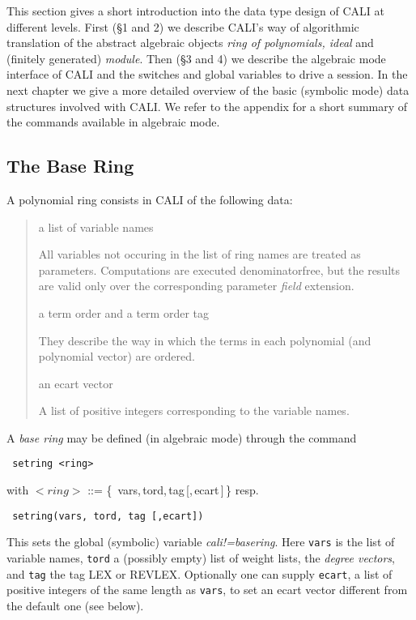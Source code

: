 \documentclass[a4paper,11pt]{article}
\newcommand{\ind}[1]{{\em #1}\index{#1}}
\newcommand{\pbx}[1]{\mbox{}\hfill \parbox[t]{12cm}{#1} \pagebreak[3]}
\begin{document}
This section gives a short introduction into the data type design of
CALI at different levels. First (\S 1 and 2) we describe CALI's way
of algorithmic translation of the abstract algebraic objects {\em
ring of polynomials, ideal} and (finitely generated) {\em module}.
Then (\S 3 and 4) we describe the algebraic mode interface of CALI
and the switches and global variables to drive a session. In the next
chapter we give a more detailed overview of the basic (symbolic mode) data
structures involved with CALI. We refer to the appendix for a short
summary of the commands available in algebraic mode.

\subsection{The Base Ring}

A polynomial ring consists in CALI of the following data:
\begin{quote}
a list of variable names 

\pbx{All variables not occuring in the list of ring names are treated
as parameters. Computations are executed denominatorfree, but the
results are valid only over the corresponding parameter {\em field}
extension.}

a term order and a term order tag

\pbx{They describe the way in which the terms in each polynomial (and
polynomial vector) are ordered.}

an ecart vector

\pbx{A list of positive integers corresponding to the variable
names.}
\end{quote}

A \ind{base ring} may be defined (in algebraic mode) through the
command 
\begin{verbatim}
 setring <ring>
\end{verbatim}
with $<ring>$ ::= \{\, vars,\,tord,\,tag\,[,\,ecart\,]\,\} resp.
\begin{verbatim}
 setring(vars, tord, tag [,ecart])
\end{verbatim}
This sets the global (symbolic) variable \ind{cali!=basering}. Here
{\tt vars} is the list of variable names, {\tt tord} a (possibly
empty) list of weight lists, the \ind{degree vectors}, and {\tt tag}
the tag LEX or REVLEX. Optionally one can supply {\tt ecart}, a list 
of positive integers of the same length as {\tt vars}, to set an ecart
vector different from the default one (see below).
\end{document}
